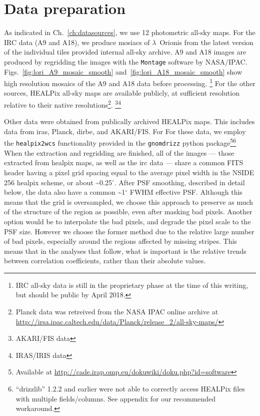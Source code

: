 	\section{Data preparation}
    \label{sec:dataprocessing}
		As indicated in Ch.~\ref{ch:datasources}, we use 12 photometric all-sky maps. For the IRC data (A9 and A18), we produce mosiacs of $\lambda$~Orionis from the latest version of the individual tiles provided internal all-sky archive. A9 and A18 images are produced by regridding the images with the {\tt Montage} software by NASA/IPAC. Figs.~\ref{fig:lori_A9_mosaic_smooth} and~\ref{fig:lori_A18_mosaic_smooth} show high resolution mosaics of the A9 and A18 data before processing.
      \footnote{IRC all-sky data is still in the proprietary phase at the time of this writing, but should be public by April 2018.}
       For the other sources, HEALPix all-sky maps are available publicly, at sufficient resolution relative to their native resolutions\footnote{Planck data was retreived from the NASA IPAC online archive at \url{http://irsa.ipac.caltech.edu/data/Planck/release_2/all-sky-maps/}}. \footnote{AKARI/FIS data }\footnote{IRAS/IRIS data }

		  Other data were obtained from publically archived HEALPix maps. This includes data from \acrshort{iras}, Planck, \acrshort{dirbe}, and AKARI/FIS. For For these data, we employ the {\tt healpix2wcs} functionality provided in the {\tt gnomdrizz} python package\footnote{Available at \url{http://cade.irap.omp.eu/dokuwiki/doku.php?id=software}}\footnote{``drizzlib'' 1.2.2 and earlier were not able to correctly access HEALPix files with multiple fields/columns. See appendix for our recommended workaround.}   When the extraction and regridding are finished, all of the images --- those extracted from \acrshort{healpix} maps, as well as the \acrshort{irc} data --- share a common FITS header having a pixel grid spacing equal to the average pixel width in the NSIDE 256 \acrshort{healpix} scheme, or about \textasciitilde{0.25$^{\circ{}}$}. After PSF smoothing, described in detail below, the data also have a common \textasciitilde{1$^{\circ{}}$} FWHM effective PSF. Although this means that the grid is oversampled, we choose this approach to preserve as much of the structure of the region as possible, even after masking bad pixels. Another option would be to interpolate the bad pixels, and degrade the pixel scale to the PSF size. However we choose the former method due to the relative large number of bad pixels, especially around the regions affected by missing stripes. This means that in the analyses that follow, what is important is the relative trends between correlation coefficients, rather than their absolute values.


